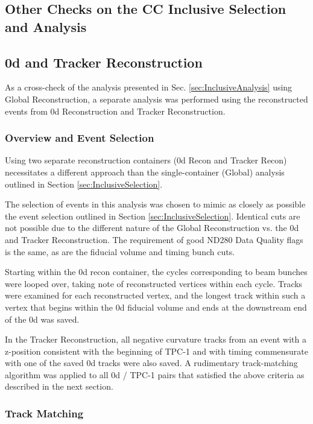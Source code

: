 \subsection{Other Checks on the CC Inclusive Selection and Analysis}
\label{sec:OtherChecks}

\subsection{\p0d and Tracker Reconstruction}
\label{sec:P0DTrackerAnalysis}

As a cross-check of the analysis presented in Sec. \ref{sec:InclusiveAnalysis}
using Global Reconstruction, a separate analysis was performed using the
reconstructed events from \p0d Reconstruction and Tracker Reconstruction.

\subsubsection{Overview and Event Selection}

Using two separate reconstruction containers (\p0d Recon and Tracker Recon)
necessitates a different approach than the single-container (Global) analysis
outlined in Section \ref{sec:InclusiveSelection}. 

The selection of events in this analysis was chosen to mimic as closely as
possible the event selection outlined in Section \ref{sec:InclusiveSelection}.
Identical cuts are not possible due to the different nature of the Global
Reconstruction vs. the \p0d and Tracker Reconstruction. The requirement of good
ND280 Data Quality flags is the same, as are the fiducial volume and
timing bunch cuts. 

Starting within the \p0d recon container, the cycles corresponding to beam
bunches were looped over, taking note of reconstructed vertices within each
cycle. Tracks were examined for each reconstructed vertex, and the longest track
within such a vertex that begins within the \p0d fiducial volume and ends at the
downstream end of the \p0d was saved. 

In the Tracker Reconstruction, all negative curvature tracks from an event with
a z-position consistent with the beginning of TPC-1 and with timing commensurate
with one of the saved \p0d tracks were also saved.  A rudimentary track-matching
algorithm was applied to all \p0d / TPC-1 pairs that satisfied the above
criteria as described in the next section.

\subsubsection{Track Matching}


